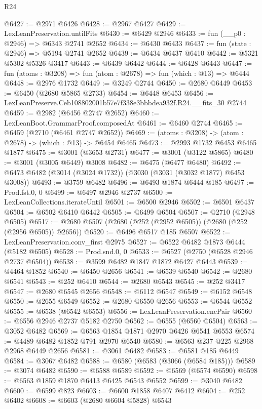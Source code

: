 \begin{lexlean}{R24}
\begin{coremodule}
@6427 := @2971 @6426
@6428 := @2967 @6427
@6429 := LexLeanPreservation.untilFits
@6430 := @6429 @2946
@6433 := fun (__p0 : @2946) => @6343 @2741 @2652
@6434 := @6430 @6433
@6437 := fun (state : @2946) => @5194 @2741 @2652
@6439 := @6434 @6437 @6410
@6442 := @5321 @5302 @5326 @3417
@6443 := @6439 @6442
@6444 := @6428 @6443
@6447 := fun (atoms : @3208) => fun (atom : @2678) => fun (which : @13) => @6444
@6448 := @2976 @1732
@6449 := @3249 @2744
@6450 := @2680 @6449
@6453 := @6450 (@2680 @5865 @2733)
@6454 := @6448 @6453
@6456 := LexLeanPreserve.Ceb108802001b57e7f338e3bbbdea932f.R24.__fits_30 @2744
@6459 := @2982 (@6456 @2747 @2652)
@6460 := LexLeanBoot.GrammarProof.composedAt
@6461 := @6460 @2744
@6465 := @6459 (@2710 (@6461 @2747 @2652))
@6469 := (atoms : @3208) -> (atom : @2678) -> (which : @13) -> @6454 @6465
@6473 := @2993 @1732 @6453 @6465 @1877
@6475 := @3001 (@3653 @2731)
@6477 := @3001 (@3122 @5865)
@6480 := @3001 (@3005 @6449) @3008
@6482 := @6475 (@6477 @6480)
@6492 := @6473 @6482 (@3014 (@3024 @1732)) (@3030 (@3031 (@3032 @1877) @6453 @3008))
@6493 := @3759 @6482
@6496 := @6493 @1874 @6444 @185
@6497 := Prod.fst.{0, 0}
@6499 := @6497 @2946 @2737
@6500 := LexLeanCollections.iterateUntil
@6501 := @6500 @2946
@6502 := @6501 @6437
@6504 := @6502 @6410 @6442
@6505 := @6499 @6504
@6507 := @2710 (@2948 @6505)
@6517 := @2680 @6507 (@2680 (@252 (@2952 @6505)) (@2680 (@252 (@2956 @6505)) @2656))
@6520 := @6496 @6517 @185 @6507
@6522 := LexLeanPreservation.conv_first @2975
@6527 := @6522 @6482 @1873 @6444 (@5182 @6505)
@6528 := Prod.snd.{0, 0}
@6533 := @6527 (@2750 (@6528 @2946 @2737 @6504))
@6538 := @3599 @6482 @1847 @1872 @6427 @6443
@6539 := @4464 @1852
@6540 := @6450 @2656
@6541 := @6539 @6540
@6542 := @2680 @6541
@6543 := @252 @6410
@6544 := @2680 @6543
@6545 := @252 @3417
@6547 := @2680 @6545 @2656
@6548 := @6112 @6547
@6549 := @6152 @6548
@6550 := @2655 @6549
@6552 := @2680 @6550 @2656
@6553 := @6544 @6552
@6555 := @6538 (@6542 @6553)
@6556 := LexLeanPreservation.encPair
@6560 := @6556 @2946 @2737 @5182 @2750
@6562 := @6555 (@6560 @6504)
@6563 := @3052 @6482
@6569 := @6563 @1854 @1871 @2970 @6426 @6541 @6553
@6574 := @4489 @6482 @1852 @791 @2970 @6540
@6580 := @6563 @237 @225 @2968 @2968 @6449 @2656
@6581 := @3061 @6482
@6583 := @6581 @185 @6449
@6584 := @3067 @6482
@6588 := @6580 (@6583 (@3066 (@6584 @185)))
@6589 := @3074 @6482
@6590 := @6588 @6589
@6592 := @6569 (@6574 @6590)
@6598 := @6563 @1859 @1870 @6413 @6425 @6543 @6552
@6599 := @3040 @6482
@6600 := @6599 @823
@6603 := @6600 @1858 @6407 @6412
@6604 := @252 @6402
@6608 := @6603 (@2680 @6604 @5828) @6543

\end{coremodule}
\end{lexlean}
